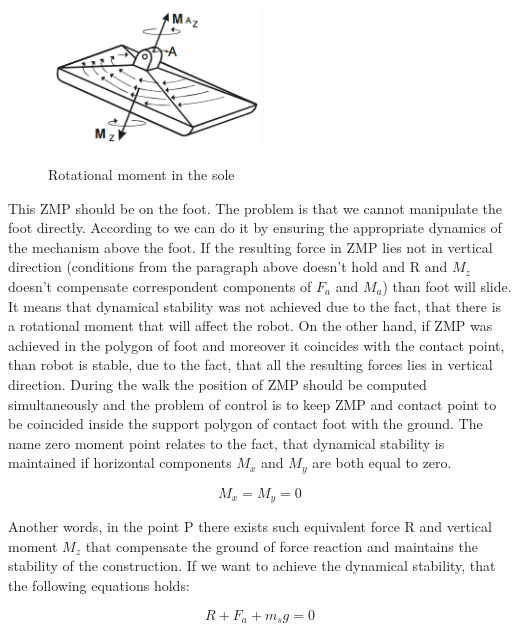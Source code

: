 \documentclass[11pt,a4paper]{article}
\begin{document}
	\begin{figure}[h!]
		\vspace{-0.2cm}
		\centering
		{\includegraphics[width=0.5\textwidth]{2}}
		\caption{Rotational moment in the sole}
		\label{fig:2}
		\vspace{-0.1cm}
	\end{figure}

This ZMP should be on the foot. The problem is that we cannot manipulate the foot directly. According to \cite{vukobratovic2004zero} we can do it by ensuring the appropriate dynamics of the mechanism above the foot. If the resulting force in ZMP lies not in vertical direction (conditions from the paragraph above doesn't hold and R and $M_z$ doesn't compensate correspondent components of $F_a$ and $M_a$) than foot will slide. It means that dynamical stability was not achieved due to the fact, that there is a rotational moment that will affect the robot. On the other hand, if ZMP was achieved in the polygon of foot and moreover it coincides with the contact point, than robot is stable, due to the fact, that all the resulting forces lies in vertical direction. During the walk the position of ZMP should be computed simultaneously and the problem of control is to keep ZMP and contact point to be coincided inside the support polygon of contact foot with the ground.
The name zero moment point relates to the fact, that dynamical stability is maintained if horizontal components $M_x$ and $M_y$ are both equal to zero.
	
	\begin{equation}
		M_x = M_y = 0
	\end{equation}

Another words, in the point P there exists such equivalent force R and vertical moment $M_z$ that compensate the ground of force reaction and maintains the stability of the construction. If we want to achieve the dynamical stability, that the following equations holds:

	\begin{equation}
		R + F_a + m_sg = 0
	\end{equation}
\end{document}
